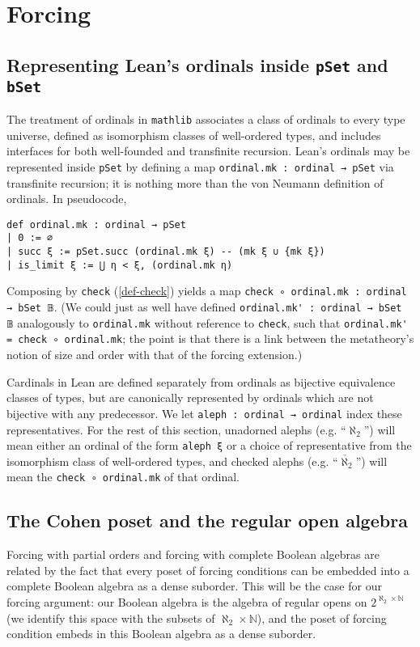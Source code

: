 \documentclass[a4paper,USenglish,cleveref, autoref]{lipics-v2019}
\newcommand{\B}{\mathbb{B}}
\newcommand{\lil}{\lstinline}
\theoremstyle{theorem}
\theoremstyle{definition}
\begin{document}
\section{Forcing}
\label{sect:forcing}

\subsection{Representing Lean's ordinals inside \lil{pSet} and \lil{bSet}}
The treatment of ordinals in \lil{mathlib} associates a class of ordinals to every type universe, defined as isomorphism classes of well-ordered types, and includes interfaces for both well-founded and transfinite recursion. Lean's ordinals may be represented inside \lil{pSet} by defining a map \lil{ordinal.mk : ordinal → pSet} via transfinite recursion; it is nothing more than the von Neumann definition of ordinals. In pseudocode,
\begin{lstlisting}
def ordinal.mk : ordinal → pSet
| 0 := ∅
| succ ξ := pSet.succ (ordinal.mk ξ) -- (mk ξ ∪ {mk ξ})
| is_limit ξ := ⋃ η < ξ, (ordinal.mk η)
\end{lstlisting}
Composing by \lil{check} (\autoref{def-check}) yields a map \lil{check ∘ ordinal.mk : ordinal → bSet 𝔹}. (We could just as well have defined \lstinline{ordinal.mk' : ordinal → bSet 𝔹} analogously to \lstinline{ordinal.mk} without reference to \lil{check}, such that \lstinline{ordinal.mk' = check ∘ ordinal.mk}; the point is that there is a link between the metatheory's notion of size and order with that of the forcing extension.)

Cardinals in Lean are defined separately from ordinals as bijective equivalence classes of types, but are canonically represented by ordinals which are not bijective with any predecessor. We let \lil{aleph : ordinal → ordinal} index these representatives. For the rest of this section, unadorned alephs (e.g. ``$\aleph_2$'') will mean either an ordinal of the form \lil{aleph ξ} or a choice of representative from the isomorphism class of well-ordered types, and checked alephs (e.g. ``$\check{\aleph_2}$'') will mean the \lil{check ∘ ordinal.mk} of that ordinal.

\subsection{The Cohen poset and the regular open algebra}
Forcing with partial orders and forcing with complete Boolean algebras are related by the fact that every poset of forcing conditions can be embedded into a complete Boolean algebra as a dense suborder. This will be the case for our forcing argument: our Boolean algebra is the algebra of regular opens on $2^{\aleph_2 \times \mathbb{N}}$ (we identify this space with the subsets of $\aleph_2 \times \mathbb{N}$), and the poset of forcing condition embeds in this Boolean algebra as a dense suborder.
\end{document}
